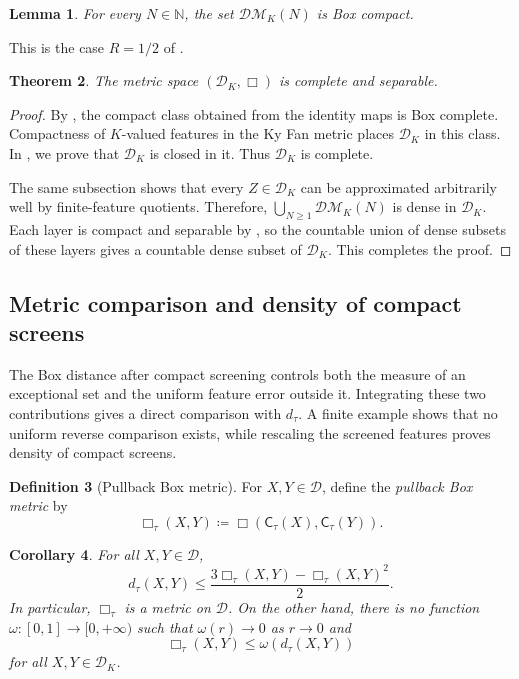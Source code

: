 \documentclass[11pt]{amsart}
\theoremstyle{plain}
\newtheorem{theorem}{Theorem}[section]
\newtheorem{lemma}[theorem]{Lemma}
\newtheorem{corollary}[theorem]{Corollary}
\theoremstyle{definition}
\newtheorem{definition}[theorem]{Definition}
\theoremstyle{remark}
\newcommand{\D}{\mathcal D}
\newcommand{\DK}{\mathcal D_K}
\newcommand{\DM}{\mathcal{DM}}
\newcommand{\dtau}{d_{\tau}}
\begin{document}
\begin{lemma}
\label{lem:bounded-measurement-compact}
For every $N\in\mathbb N$, the set $\DM_K(N)$ is Box compact.
\end{lemma}

This is the case $R=1/2$ of \cite[Lemma~4.5]{gds2}.

\begin{theorem}
\label{thm:screened-polish}
The metric space $(\DK,\Box)$ is complete and separable.
\end{theorem}

\begin{proof}
By \cite[Theorem~4.10]{gds2}, the compact class obtained from the identity maps is Box complete. Compactness of $K$-valued features in the Ky Fan metric places $\DK$ in this class. In , we prove that $\DK$ is closed in it. Thus $\DK$ is complete.

The same subsection shows that every $Z\in\DK$ can be approximated arbitrarily well by finite-feature quotients. Therefore, $\bigcup_{N\geq1}\DM_K(N)$ is dense in $\DK$. Each layer is compact and separable by , so the countable union of dense subsets of these layers gives a countable dense subset of $\DK$. This completes the proof.
\end{proof}

\subsection{Metric comparison and density of compact screens}
\label{subsec:screen-comparison-density}

The Box distance after compact screening controls both the measure of an exceptional set and the uniform feature error outside it. Integrating these two contributions gives a direct comparison with $\dtau$. A finite example shows that no uniform reverse comparison exists, while rescaling the screened features proves density of compact screens.

\begin{definition}[Pullback Box metric]
\label{def:pullback-box}
For $X,Y\in\D$, define the \emph{pullback Box metric} by
\[
\Box_\tau(X,Y)\coloneqq
\Box(\mathsf C_\tau(X),\mathsf C_\tau(Y)).
\]
\end{definition}

\begin{corollary}
\label{cor:tau-box-comparison}
For all $X,Y\in\D$,
\[
\dtau(X,Y)
\leq\frac{3\Box_\tau(X,Y)-\Box_\tau(X,Y)^2}{2}.
\]
In particular, $\Box_\tau$ is a metric on $\D$. On the other hand, there is no function $\omega\colon[0,1]\to[0,+\infty)$ such that $\omega(r)\to0$ as $r\to0$ and
\[
\Box_\tau(X,Y)\leq\omega(\dtau(X,Y))
\]
for all $X,Y\in\DK$.
\end{corollary}
\end{document}
